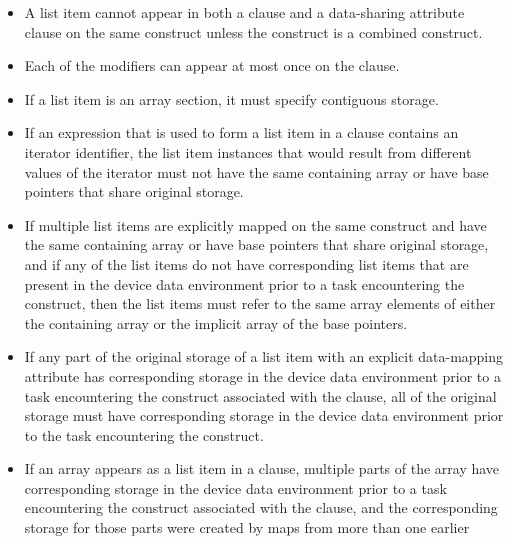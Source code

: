 \begin{itemize}
\item A list item cannot appear in both a  clause and a data-sharing
      attribute clause on the same construct unless the construct is a
      combined construct.
\item Each of the  modifiers can appear at most once on the
       clause.


\item If a list item is an array section, it must specify contiguous storage.
\item If an expression that is used to form a list item in a  clause
      contains an iterator identifier, the list item instances that would
      result from different values of the iterator must not have the same
      containing array or have base pointers that share original storage.
\item If multiple list items are explicitly mapped on the same construct and 
      have the same containing array or have base pointers that share original 
      storage, and if any of the list items do not have corresponding list
      items that are present in the device data environment prior to a task
      encountering the construct, then the list items must refer to the same 
      array elements of either the containing array or the implicit array of 
      the base pointers.
\item If any part of the original storage of a list item with an explicit 
      data-mapping attribute has corresponding storage in the device data
      environment prior to a task encountering the construct associated with the
       clause, all of the original storage must have corresponding storage
      in the device data environment prior to the task encountering the construct.
\item If an array appears as a list item in a  clause, multiple parts
      of the array have corresponding storage in the device data environment
      prior to a task encountering the construct associated with the
       clause, and the corresponding storage for those
      parts were created by maps from more than one earlier

\end{itemize}
